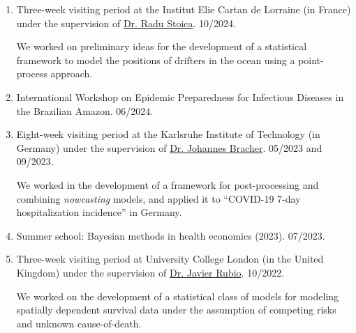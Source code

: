 \documentclass[10pt, ]{article}
\begin{document}
	\begin{enumerate}[noitemsep, topsep=0pt]
		\item Three-week visiting period at the Institut Elie Cartan de Lorraine (in France) under the supervision of \href{https://sites.google.com/site/radustefanstoica/}{Dr. Radu Stoica}. 10/2024.\vspace{3pt}
		
		We worked on preliminary ideas for the development of a statistical framework to model the positions of drifters in the ocean using a point-process approach. \vspace{3pt}
		
		\item International Workshop on Epidemic Preparedness for Infectious Diseases in the Brazilian Amazon. 06/2024.
		
		\item Eight-week visiting period at the Karlsruhe Institute of Technology (in Germany) under the supervision of \href{https://jbracher.github.io/}{Dr. Johannes Bracher}. 05/2023 and 09/2023.\vspace{3pt}
		
		We worked in the development of a framework for post-processing and combining \textit{nowcasting} models, and applied it to ``COVID-19 7-day hospitalization incidence'' in Germany.\vspace{3pt}
		
		\item Summer school: Bayesian methods in health economics (2023).  07/2023.
		
		\item Three-week visiting period at University College London (in the United Kingdom) under the supervision of \href{https://sites.google.com/site/fjavierrubio67/}{Dr. Javier Rubio}. 10/2022.\vspace{3pt}
		
		We worked on the development of a statistical class of models for modeling spatially dependent survival data under the assumption of competing risks and unknown cause-of-death. \vspace{3pt}
		
		
		

\end{enumerate}
\end{document}
